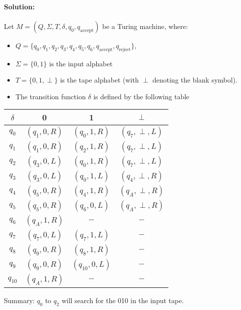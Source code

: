 \documentclass{article}
\begin{document}
\begin{enumerate}
\begin{enumerate}
            \paragraph{Solution: }
                Let $M=(Q,\Sigma,T,\delta,q_0,q_{\text{accept}})$ be a Turing machine, where:
                \begin{itemize}
                    \item[] $Q=\{q_0,q_1,q_2,q_3,q_4,q_5,q_6,q_{\text{accept}},q_{\text{reject}}\} $,
                    \item[] $\Sigma=\{0,1\} $ is the input alphabet
                    \item[] $T=\{0,1,\perp \} $ is the tape alphabet (with $\perp $ denoting the blank symbol).
                    \item[] The transition function $\delta$ is defined by the following table 
                \end{itemize}
                \begin{center}
                    \begin{tabular}{c|c|c|c}
                    $\delta$ & 0 & 1 & $\perp $ \\
                    \hline
                    $q_0$ &$(q_1,0,R)$&$(q_0,1,R)$&$(q_7,\perp ,L)$ \\ 
                    $q_1$ &$(q_1,0,R)$&$(q_2,1,R)$&$(q_7,\perp ,L)$ \\ 
                    $q_2$ &$(q_3,0,L)$&$(q_0,1,R)$&$(q_7,\perp ,L)$\\ 
                    $q_3$ &$(q_3,0,L)$&$(q_0,1,L)$& $(q_4,\perp ,R)$\\ 
                    $q_4$ &$(q_5,0,R)$&$(q_4,1,R)$& $(q_A,\perp ,R)$\\ 
                    $q_5$ &$(q_5,0,R)$&$(q_6,0,L)$& $(q_A,\perp ,R)$\\ 
                    $q_6$ &$(q_A,1,R)$&$-$& $-$\\ 
                    $q_7$ &$(q_7,0,L)$&$(q_7,1,L)$& $-$\\ 
                    $q_8$ &$(q_9,0,R)$&$(q_8,1,R)$& $-$\\ 
                    $q_9$ &$(q_9,0,R)$&$(q_{10},0,L)$& $-$\\ 
                    $q_{10}$ &$(q_A,1,R)$&$-$& $-$\\ 
                    \end{tabular}
                \end{center}
                Summary: $q_0$ to $q_2$ will search for the 010 in the input tape.


\end{enumerate}
\end{enumerate}
\end{document}
